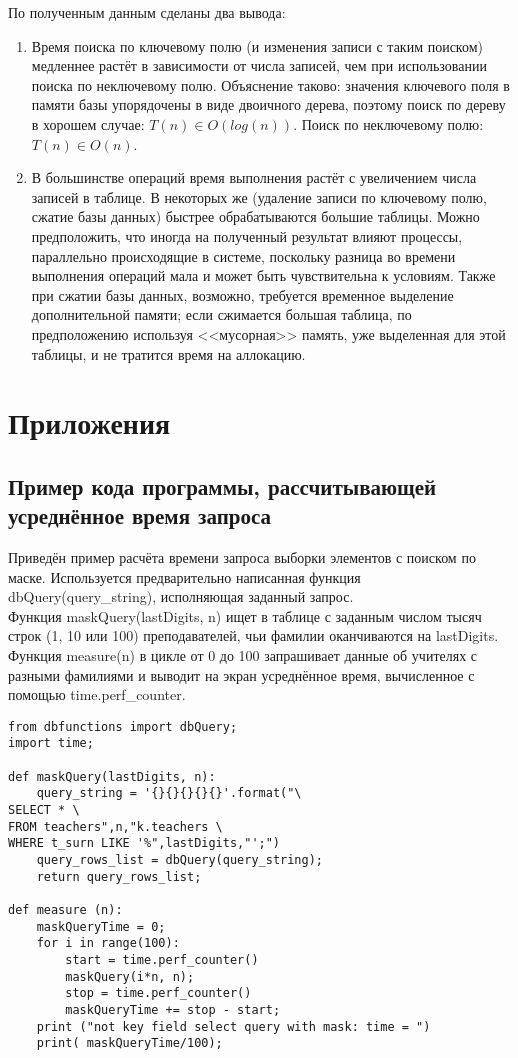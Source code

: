 \documentclass[zuevDbReport.tex]{subfiles}
\begin{document}
\newpage
По полученным данным сделаны два вывода:
\begin{enumerate}
\item{}Время поиска по ключевому полю (и изменения записи с таким поиском) медленнее растёт в зависимости от числа записей, чем при использовании поиска по неключевому полю. Объяснение таково: значения ключевого поля в памяти базы упорядочены в виде двоичного дерева, поэтому поиск по дереву в хорошем случае: $T(n) \in O(log(n))$. Поиск по неключевому полю: $T(n) \in O(n)$.
\item{}В большинстве операций время выполнения растёт с увеличением числа записей в таблице. В некоторых же (удаление записи по ключевому полю, сжатие базы данных) быстрее обрабатываются большие таблицы. Можно предположить, что иногда на полученный результат влияют процессы, параллельно происходящие в системе, поскольку разница во времени выполнения операций мала и может быть чувствительна к условиям. Также при сжатии базы данных, возможно, требуется временное выделение дополнительной памяти; если сжимается большая таблица, по предположению используя <<мусорная>> память, уже выделенная для этой таблицы, и не тратится время на аллокацию.
\end{enumerate}

\newpage
\section{Приложения}
\subsection{Пример кода программы, рассчитывающей усреднённое время запроса}
\label{QTimeCode}
Приведён пример расчёта времени запроса выборки элементов с поиском по маске. Используется предварительно написанная функция dbQuery(query\_string), исполняющая заданный запрос.\\
Функция maskQuery(lastDigits, n) ищет в таблице с заданным числом тысяч строк (1, 10 или 100) преподавателей, чьи фамилии оканчиваются на lastDigits.
Функция measure(n) в цикле от 0 до 100 запрашивает данные об учителях с разными фамилиями и выводит на экран усреднённое время, вычисленное с помощью time.perf\_counter.\\
\begin{lstlisting}
from dbfunctions import dbQuery;
import time;

def maskQuery(lastDigits, n):
    query_string = '{}{}{}{}{}'.format("\
SELECT * \
FROM teachers",n,"k.teachers \
WHERE t_surn LIKE '%",lastDigits,"';")
    query_rows_list = dbQuery(query_string);
    return query_rows_list;

def measure (n):
    maskQueryTime = 0;
    for i in range(100):
        start = time.perf_counter()
        maskQuery(i*n, n);
        stop = time.perf_counter()
        maskQueryTime += stop - start;
    print ("not key field select query with mask: time = ")
    print( maskQueryTime/100);
\end{lstlisting}
\end{document}
